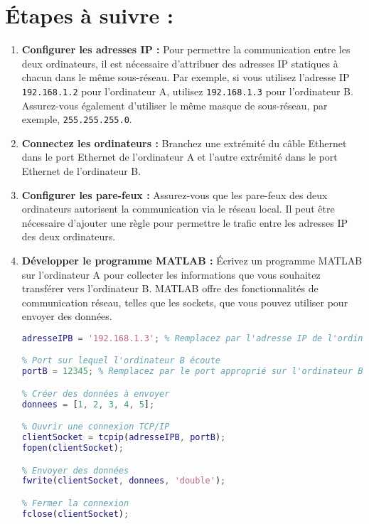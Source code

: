 \section{Étapes à suivre :}
\begin{enumerate}
    \item \textbf{Configurer les adresses IP :} Pour permettre la communication entre les deux ordinateurs, il est nécessaire d'attribuer des adresses IP statiques à chacun dans le même sous-réseau. Par exemple, si vous utilisez l'adresse IP \texttt{192.168.1.2} pour l'ordinateur A, utilisez \texttt{192.168.1.3} pour l'ordinateur B. Assurez-vous également d'utiliser le même masque de sous-réseau, par exemple, \texttt{255.255.255.0}.

    \item \textbf{Connectez les ordinateurs :} Branchez une extrémité du câble Ethernet dans le port Ethernet de l'ordinateur A et l'autre extrémité dans le port Ethernet de l'ordinateur B.

    \item \textbf{Configurer les pare-feux :} Assurez-vous que les pare-feux des deux ordinateurs autorisent la communication via le réseau local. Il peut être nécessaire d'ajouter une règle pour permettre le trafic entre les adresses IP des deux ordinateurs.

    \item \textbf{Développer le programme MATLAB :} Écrivez un programme MATLAB sur l'ordinateur A pour collecter les informations que vous souhaitez transférer vers l'ordinateur B. MATLAB offre des fonctionnalités de communication réseau, telles que les sockets, que vous pouvez utiliser pour envoyer des données.
    
\begin{lstlisting}[language=Matlab, caption={Programme MATLAB sur l'ordinateur A (l'émetteur)}]
% Adresse IP de l'ordinateur B
adresseIPB = '192.168.1.3'; % Remplacez par l'adresse IP de l'ordinateur B

% Port sur lequel l'ordinateur B écoute
portB = 12345; % Remplacez par le port approprié sur l'ordinateur B

% Créer des données à envoyer
donnees = [1, 2, 3, 4, 5];

% Ouvrir une connexion TCP/IP
clientSocket = tcpip(adresseIPB, portB);
fopen(clientSocket);

% Envoyer des données
fwrite(clientSocket, donnees, 'double');

% Fermer la connexion
fclose(clientSocket);
\end{lstlisting}


\end{enumerate}
